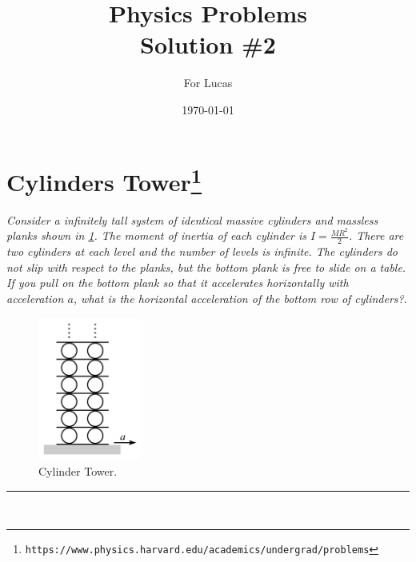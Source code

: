 \documentclass{article}
\begin{document}
\title{Physics Problems\\ Solution \#2} %

\author{For Lucas} %

\date{\today}
\maketitle

\section*{Cylinders Tower\footnote{\texttt{https://www.physics.harvard.edu/academics/undergrad/problems}}}

\textit{Consider a infinitely tall system of identical massive cylinders and massless planks shown in \ref{fig:tower}. The moment of inertia of each cylinder is $I = \frac{MR^2}{2}$. There are two cylinders at each level and the number of levels is infinite. The cylinders do not slip with respect to the planks, but the bottom plank is free to slide on a table. If you pull on the bottom plank so that it accelerates horizontally with acceleration $a$, what is the horizontal acceleration of the bottom row of cylinders?}.

\begin{figure}[h!]
\begin{center}
\includegraphics[width=0.3\textwidth]{tower.png}
\end{center}
\caption{Cylinder Tower.}
\label{fig:tower}
\end{figure}

\begin{center}
\noindent\rule{3cm}{0.4pt}\\
\end{center}

\vspace{2mm}
\end{document}
